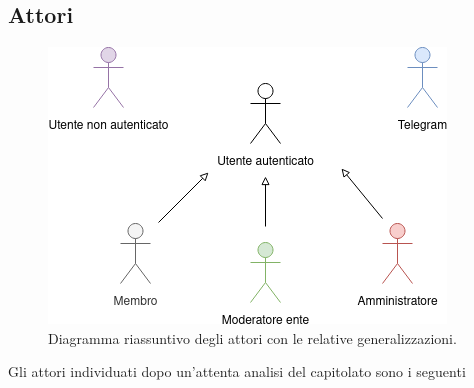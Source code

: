 	\subsection{Attori}

		\begin{figure}[t!]
			\centering
			\includegraphics[scale=0.75]{res/images/attori}
			\caption{Diagramma riassuntivo degli attori con le relative generalizzazioni.}
		\end{figure}

		Gli attori individuati dopo un'attenta analisi del capitolato sono i seguenti
